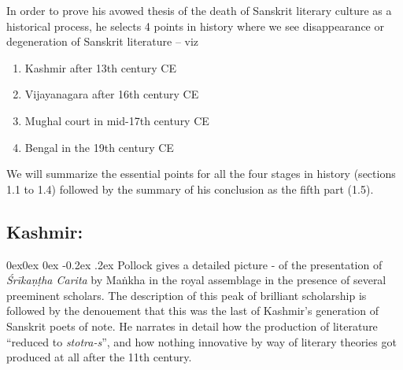 In order to prove his avowed thesis of the death of Sanskrit literary culture as a historical process, he selects 4 points in history where we see disappearance or degeneration of Sanskrit literature – viz
\begin{enumerate}
\itemsep=0pt
\item Kashmir after 13th century CE
\item Vijayanagara after 16th century CE
\item Mughal court in mid-17th century CE
\item Bengal in the 19th century CE
\end{enumerate}

We will summarize the essential points for all the four stages in history (sections 1.1 to 1.4) followed by the summary of his conclusion as the fifth part (1.5).

\makeatletter
\renewcommand\subsubsection{\@startsection{subsubsection}{3}{\z@}%
                                     {0ex\@plus 0ex \@minus 0ex}%
                                     {-0.2ex \@plus .2ex}%
                                     {\normalfont\normalsize\bfseries}}
\makeatother                                     

\subsection{Kashmir:}

\subsubsection{} Pollock gives a detailed picture - of the presentation of {\sl Śrīkaṇṭha Carita} by Maṅkha in the royal assemblage in the presence of several preeminent scholars. The description of this peak of brilliant scholarship is followed by the denouement that this was the last of Kashmir’s generation of Sanskrit poets of note.  He narrates in detail how the production of literature “reduced to {\sl stotra-s}”, and how nothing innovative by way of literary theories got produced at all after the 11th century.

